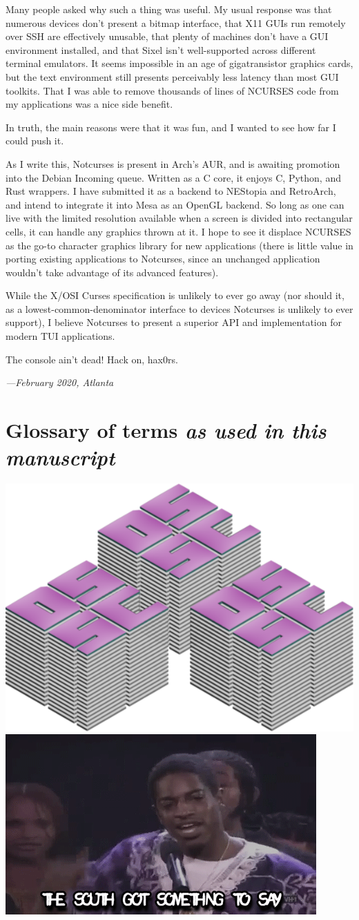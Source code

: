 \documentclass[letterpaper,10pt]{article}
\newcommand\CC{C\nolinebreak\hspace{-.05em}\raisebox{.4ex}{\relsize{-3}{\textbf{+}}}\nolinebreak\hspace{-.10em}\raisebox{.4ex}{\relsize{-3}{\textbf{+}}}\hspace{.2em}}
\begin{document}
Many people asked why such a thing was useful. My usual response was that
numerous devices don't present a bitmap interface, that X11 GUIs run remotely
over SSH are effectively unusable, that plenty of machines don't have a GUI
environment installed, and that Sixel isn't well-supported across different
terminal emulators. It seems impossible in an age of gigatransistor graphics
cards, but the text environment still presents perceivably less latency
than most GUI toolkits. That I was able to remove thousands of lines
of NCURSES code from my applications was a nice side benefit.

In truth, the main reasons were that it was fun, and I wanted to see how far
I could push it.

As I write this, Notcurses is present in Arch's AUR, and is awaiting promotion
into the Debian Incoming queue. Written as a C core, it enjoys \CC, Python, and
Rust wrappers. I have submitted it as a backend to NEStopia and RetroArch, and
intend to integrate it into Mesa as an OpenGL backend. So long as one can live
with the limited resolution available when a screen is divided into rectangular
cells, it can handle any graphics thrown at it. I hope to see it displace
NCURSES as the go-to character graphics library for new applications (there is
little value in porting existing applications to Notcurses, since an unchanged
application wouldn't take advantage of its advanced features).

While the X/OSI Curses specification is unlikely to ever go away (nor should
it, as a lowest-common-denominator interface to devices Notcurses is unlikely
to ever support), I believe Notcurses to present a superior API and
implementation for modern TUI applications.

The console ain't dead! Hack on, hax0rs.

\flushright\textit{---February 2020, Atlanta}

\newpage

\section{Glossary of terms \textit{as used in this manuscript}}

\printnoidxglossaries

\newpage

\printbibliography
\vfill
\begin{center}
\includegraphics[width=.4\linewidth]{../common/dsscaw-purp-scaled.png}
\includegraphics[width=.5\linewidth]{../common/south.png}
\end{center}
\end{document}
